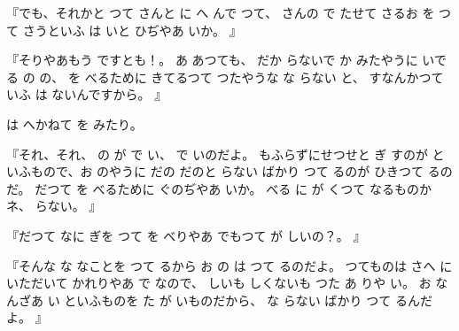 
『でも、それかと
つて
さんと
に
へ
んで
つて、
さんの
で
たせて
さるお
を
つて
さうといふ
は
いと
ひぢやあ
いか。
』

『そりやあもう
ですとも！。
あ
あつても、
だか
らないで
か
みたやうに
いでる
の
の、
を
べるために
きてるつて
つたやうな
な
らない
と、
すなんかつていふ
は
ないんですから。
』

は
へかねて
を
みたり。

『それ、それ、
の
が
で
い、
で
いのだよ。
もふらずにせつせと
ぎ
すのが
といふもので、お
のやうに
だの
だのと
らない
ばかり
つて
るのが
ひきつて
るのだ。
だつて
を
べるために
ぐのぢやあ
いか。
べる
に
が
くつて
なるものかネ、
らない。
』

『だつて
なに
ぎを
      つて
を
べりやあ
でもつて
が
しいの？。
』

『そんな
な
なことを
つて
るから
お
の
は
つて
るのだよ。
つてものは
さへ
にいただいて
かれりやあ
で
なので、
しいも
しくないも
つた
あ
りや
い。
お
なんざあ
い
といふものを
た
が
いものだから、
な
らない
ばかり
つて
るんだよ。
』

